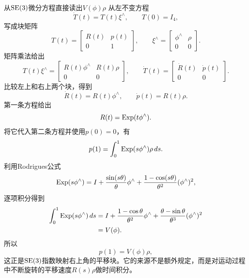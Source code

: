\begin{lieexample}{从$\operatorname{SE}(3)$微分方程直接读出$V(\phi)\rho$}
从左不变方程
\[
    \dot T(t)=T(t)\xi^\wedge,
    \qquad T(0)=I_4,
\]
写成块矩阵
\[
    T(t)=
    \begin{bmatrix}R(t)&p(t)\\0&1\end{bmatrix},
    \qquad
    \xi^\wedge=
    \begin{bmatrix}\phi^\wedge&\rho\\0&0\end{bmatrix}.
\]
矩阵乘法给出
\[
    T(t)\xi^\wedge
    =
    \begin{bmatrix}
        R(t)\phi^\wedge&R(t)\rho\\
        0&0
    \end{bmatrix},
    \qquad
    \dot T(t)=
    \begin{bmatrix}\dot R(t)&\dot p(t)\\0&0\end{bmatrix}.
\]
比较左上和右上两个块，得到
\[
    \boxed{\dot R(t)=R(t)\phi^\wedge,}
    \qquad
    \boxed{\dot p(t)=R(t)\rho.}
\]
第一条方程给出
\[
    R(t)=\operatorname{Exp}(t\phi^\wedge).
\]
将它代入第二条方程并使用$p(0)=0$，有
\[
    p(1)=\int_0^1\operatorname{Exp}(s\phi^\wedge)\rho\,ds.
\]
利用Rodrigues公式
\[
    \operatorname{Exp}(s\phi^\wedge)
    =I+\frac{\sin(s\theta)}{\theta}\phi^\wedge
    +\frac{1-\cos(s\theta)}{\theta^2}(\phi^\wedge)^2,
\]
逐项积分得到
\[
\begin{aligned}
    \int_0^1\operatorname{Exp}(s\phi^\wedge)\,ds
    &=I+\frac{1-\cos\theta}{\theta^2}\phi^\wedge
      +\frac{\theta-\sin\theta}{\theta^3}(\phi^\wedge)^2\\
    &=V(\phi).
\end{aligned}
\]
所以
\[
    p(1)=V(\phi)\rho,
\]
这正是$\operatorname{SE}(3)$指数映射右上角的平移块。它的来源不是额外规定，而是对运动过程中不断旋转的平移速度$R(s)\rho$做时间积分。
\end{lieexample}

